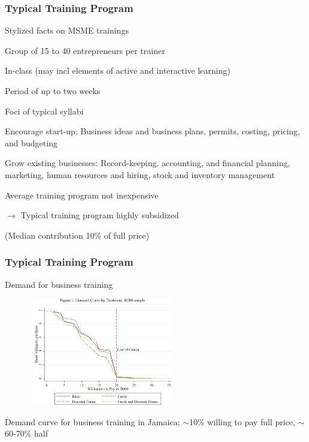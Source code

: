 \documentclass[hideothersubsections, usenames,dvipsnames,11pt]{beamer}
\newenvironment{itemize_2pt}{\itemize\addtolength{\itemsep}{2pt}}{\enditemize}
\begin{document}

\begin{frame}
\frametitle{Typical Training Program}
Stylized facts on MSME trainings
\begin{itemize_2pt}
	\item Group of 15 to 40 entrepreneurs per trainer
	\item \textcolor{bdf}{In-class} (may incl elements of active and interactive learning)
	\item Period of up to two weeks	
	\item Foci of typical syllabi
	\begin{itemize_2pt}
		\item \textcolor{bdf}{Encourage start-up}: Business ideas and business plans, permits, costing, pricing, and budgeting
		\item \textcolor{bdf}{Grow existing businesses}: Record-keeping, accounting, and financial planning, marketing, human resources and hiring, stock and inventory management
	\end{itemize_2pt}
	
	\item Average training program not inexpensive \citep[USD 177 per person for ILO training;][]{vanLieshout2017}
	\item[] $\rightarrow$ Typical training program \textcolor{bdf}{highly subsidized}
	\item[] \quad (Median contribution 10\% of full price)
	
\end{itemize_2pt}

\end{frame}


\begin{frame}
\frametitle{Typical Training Program}
	
Demand for business training
	
\begin{figure}[htbp]
	\centering
	\includegraphics[width=17em]{pics/Maffioli2020_demand.png}
	\label{Maffioli(2020): Demand}
\end{figure}

\begin{itemize_2pt}
	\item Demand curve for business training in Jamaica: \textcolor{bdf}{$\sim$10\% willing to pay full price}, $\sim$60-70\% half  \citep{Maffioli2020}
\end{itemize_2pt}

\end{frame}
\end{document}
